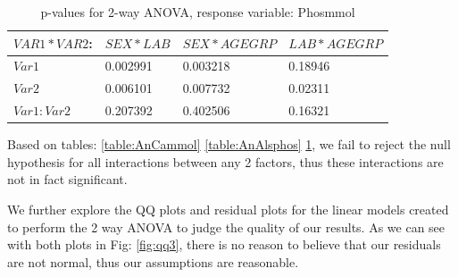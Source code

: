 \documentclass{article}
\begin{document}
    \begin{table}[H]
    \begin{center}
    \begin{tabular}{|l|l|l|l|}
      \hline
      $VAR1 * VAR2$:&$SEX * LAB$&$SEX * AGEGRP$&$LAB*AGEGRP$\\
      \hline
      $Var1$       & 0.002991 & 0.003218 & 0.18946\\
      $Var2$       & 0.006101 & 0.007732 & 0.02311\\
      $Var1:Var2$  & 0.207392 & 0.402506 & 0.16321\\
      \hline
    \end{tabular}
    \caption{p-values for 2-way ANOVA, response variable: Phosmmol}
    \label{table:AnPhosmmol}
    \end{center}
    \end{table}
 
Based on tables: \ref{table:AnCammol} \ref{table:AnAlsphos} \ref{table:AnPhosmmol}, we fail to reject the null hypothesis for all interactions between any 2 factors, thus these interactions are not in fact significant.

We further explore the QQ plots and residual plots for the linear models created to perform the 2 way ANOVA to judge the quality of our results. As we can see with both plots in Fig: \ref{fig:qq3}, there is no reason to believe that our residuals are not normal, thus our assumptions are reasonable.
    
\end{document}
